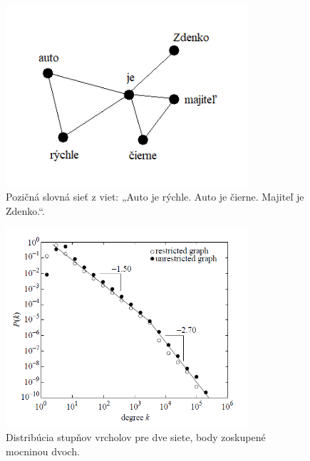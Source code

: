 \begin{figure}
    \centerline{\includegraphics[width=0.8\textwidth]{images/wan.png}}
    \caption[Pozičná slovná sieť.]{Pozičná slovná sieť z viet: „Auto je rýchle. Auto je čierne. Majiteľ je Zdenko.“.}
    \label{obr:wan}
\end{figure}

\begin{figure}
    \centerline{\includegraphics[width=0.8\textwidth]{images/degdist.png}}
    \caption[Distribúcia stupňov vrcholov.]{Distribúcia stupňov vrcholov pre dve siete, body zoskupené mocninou dvoch\cite{cancho2001small}.}
    \label{obr:degdist}
\end{figure}
